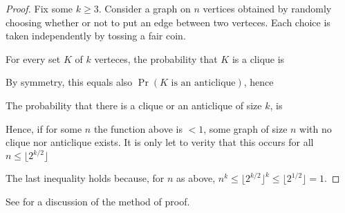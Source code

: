 \documentclass[scombinatorics.tex]{subfiles}
\begin{document}
\begin{proof}
  Fix some $k\ge3$. Consider a graph on $n$ vertices obtained by randomly choosing whether or not to put an edge between two verteces.
  Each choice is taken independently by tossing a fair coin.

  For every set $K$ of $k$ verteces, the probability that $K$ is a clique is 


  By symmetry, this equals also $\Pr(K\textrm{ is an anticlique})$, hence


  The probability that there is a clique or an anticlique of size $k$, is 


  Hence, if for some $n$ the function above is $<1$, some graph of size $n$ with no clique nor anticlique exists. 
  It is only let to verity that this occurs for all $n\le\lfloor2^{k/2}\rfloor$ 


  
  

The last inequality holds because, for $n$ as above, $n^k\le\lfloor2^{k/2}\rfloor^k\le\lfloor2^{1/2}\rfloor= 1$.
\end{proof}

See \cite{AS} for a discussion of the method of proof.
\end{document}
